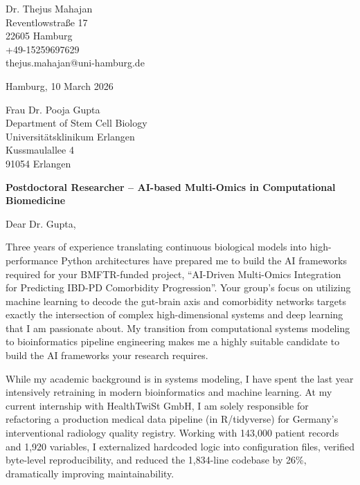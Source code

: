 \documentclass[9pt, a4paper]{extarticle}
\begin{document}
\pagestyle{empty}

\begin{flushleft}
Dr. Thejus Mahajan\\
Reventlowstra{\ss}e 17\\
22605 Hamburg\\
+49-15259697629\\
thejus.mahajan@uni-hamburg.de
\end{flushleft}

\vspace{0.3cm}

\begin{flushright}
Hamburg, 10 March 2026
\end{flushright}

\vspace{0.3cm}

\begin{flushleft}
Frau Dr. Pooja Gupta\\
Department of Stem Cell Biology\\
Universit\"atsklinikum Erlangen\\
Kussmaulallee 4\\
91054 Erlangen
\end{flushleft}

\vspace{0.3cm}

\textbf{Postdoctoral Researcher – AI-based Multi-Omics in Computational Biomedicine}

\vspace{0.2cm}

Dear Dr. Gupta,

Three years of experience translating continuous biological models into high-performance Python architectures have prepared me to build the AI frameworks required for your BMFTR-funded project, ``AI-Driven Multi-Omics Integration for Predicting IBD-PD Comorbidity Progression''. Your group's focus on utilizing machine learning to decode the gut-brain axis and comorbidity networks targets exactly the intersection of complex high-dimensional systems and deep learning that I am passionate about. My transition from computational systems modeling to bioinformatics pipeline engineering makes me a highly suitable candidate to build the AI frameworks your research requires.

While my academic background is in systems modeling, I have spent the last year intensively retraining in modern bioinformatics and machine learning. At my current internship with HealthTwiSt GmbH, I am solely responsible for refactoring a production medical data pipeline (in R/tidyverse) for Germany's interventional radiology quality registry. Working with 143,000 patient records and 1,920 variables, I externalized hardcoded logic into configuration files, verified byte-level reproducibility, and reduced the 1,834-line codebase by 26\%, dramatically improving maintainability.
\end{document}
